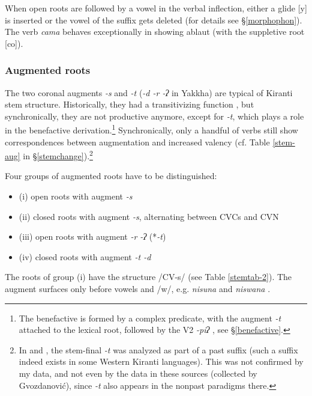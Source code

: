 When open roots are followed by a vowel in the verbal inflection, either a glide [y] is inserted or the vowel of the suffix gets deleted (for details see §\ref{morphophon}). The verb \emph{cama} behaves exceptionally in showing ablaut (with the suppletive root [co]). 

\subsubsection{Augmented roots}

The two coronal augments \emph{-s} and \emph{-t} (\emph{\ti -d \ti -r \ti -ʔ} in Yakkha) are typical of Kiranti stem structure. Historically, they had a transitivizing function \citep{Sprigg1985The-Limbu, Michailovsky1985Tibeto-Burman, Driem1989_Reflexes, Matisoff2003Handbook, Bickel2003Belhare, Bickeletal2007Free}, but synchronically, they are not productive anymore, except for \emph{-t}, which plays a role in the benefactive derivation.\footnote{The benefactive is formed by a complex predicate, with the augment \emph{-t}  attached to the lexical root, followed by the V2 \emph{-piʔ} , see §\ref{benefactive}.} Synchronically, only a handful of verbs still show correspondences between augmentation and increased valency (cf. Table \ref{stem-aug} in §\ref{stemchange}).\footnote{In \citet{Driem1994The-Yakkha} and \citet{Gvozdanovic1987How}, the stem-final \emph{-t} was analyzed as part of a past suffix (such a suffix indeed exists in some Western Kiranti languages). This was not confirmed by my data, and not even by the data in these sources (collected by Gvozdanović), since \emph{-t} also appears in the nonpast paradigms there.} 

Four groups of augmented roots have to be distinguished: 

\begin{itemize}
\item (i) open roots with augment \emph{-s}
\item (ii) closed roots with augment \emph{-s}, alternating between CVCs and CVN
\item (iii)  open roots with augment \emph{-r \ti -ʔ} (*\emph{-t})
\item (iv) closed roots with  augment \emph{-t \ti -d}
\end{itemize}
 

The roots of  group (i) have the structure /CV-s/ (see Table \ref{stemtab-2}). The augment surfaces only before vowels and /w/, e.g. \emph{nisuna}  and \emph{niswana} . 

